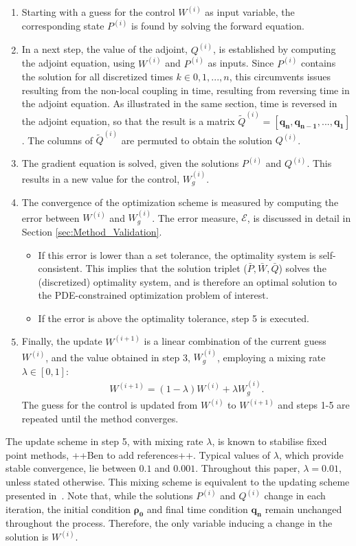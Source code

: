 \documentclass[11pt, a4paper]{article}
\theoremstyle{definition}
\newcommand{\adj}{q}
\begin{document}
\begin{enumerate}
	\item Starting with a guess for the control $W^{(i)}$ as input variable, the corresponding state $P^{(i)}$ is found by solving the forward equation.
	\item In a next step, the value of the adjoint, $Q^{(i)}$, is established by computing the adjoint equation, using $W^{(i)}$ and $P^{(i)}$ as inputs. Since $P^{(i)}$ contains the solution for all discretized times $k \in 0,1,...,n$, this circumvents issues resulting from the non-local coupling in time, resulting from reversing time in the adjoint equation. As illustrated in the same section, time is reversed in the adjoint equation, so that the result is a matrix $\tilde{Q}^{(i)} =  [\boldsymbol{\adj_n},\boldsymbol{\adj_{n-1}}, ..., \boldsymbol{\adj_1} ]$. The columns of $\tilde{Q}^{(i)}$ are permuted to obtain the solution  $Q^{(i)}$.
	\item The gradient equation is solved, given the solutions $P^{(i)}$ and $Q^{(i)}$. This results in a new value for the control, $W^{(i)}_g$.
	\item  The convergence of the optimization scheme is measured by computing the error between $W^{(i)}$ and $W^{(i)}_{g}$. The error measure, $\mathcal{E}$, is discussed in detail in Section \ref{sec:Method_Validation}. 
	\begin{itemize}
		\item  If this error is lower than a set tolerance, the optimality system is self-consistent. This implies that the solution triplet ($\bar{P},\bar{W},\bar{Q}$) solves the (discretized) optimality system, and is therefore an optimal solution to the PDE-constrained optimization problem of interest.
		\item If the error is above the optimality tolerance, step 5 is executed.
	\end{itemize}
	\item Finally, the update $W^{(i+1)}$ is a linear combination of the current guess $W^{(i)}$, and the value obtained in step 3, $W^{(i)}_{g}$, employing a mixing rate $\lambda \in [0,1]$:
	\begin{align*}
	W^{(i+1)} = (1-\lambda)W^{(i)} + \lambda W^{(i)}_{g}.
	\end{align*}
	The guess for the control is updated from $W^{(i)} $ to $W^{(i+1)} $ and steps 1-5 are repeated until the method converges. 
\end{enumerate}
\vspace{0.3cm}
The update scheme in step 5, with mixing rate $\lambda$, is known to stabilise fixed point methods, ++Ben to add references++. Typical values of $\lambda$, which provide stable convergence, lie between $0.1$ and $0.001$. Throughout this paper, $\lambda =0.01$, unless stated otherwise. This mixing scheme is equivalent to the updating scheme presented in~\cite{Burger1}. 
Note that, while the solutions $P^{(i)}$ and $Q^{(i)}$ change in each iteration, the initial condition $\boldsymbol{\rho_0}$ and final time condition $\boldsymbol{\adj_n}$ remain unchanged throughout the process. Therefore, the only variable inducing a change in the solution is $W^{(i)}$.
\end{document}
